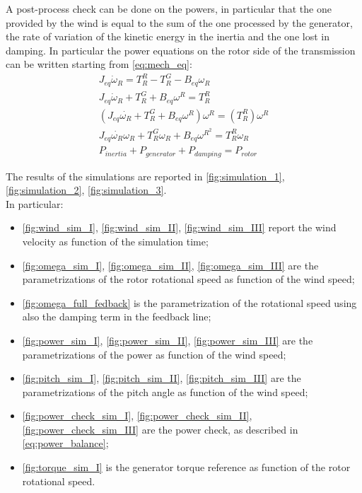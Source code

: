 A post-process check can be done on the powers, in particular that the one provided by the wind is equal to the sum of the one processed by the generator, the rate of variation of the kinetic energy in the inertia and the one lost in damping. In particular the power equations on the rotor side of the transmission can be written starting from \autoref{eq:mech_eq}:
\begin{gather}
    J_{eq}\dot{\omega}_{R} = T_R^R - T_R^G-B_{eq}\omega_R\\
    J_{eq}\dot{\omega}_{R} + T_R^G + B_{eq}\omega^R = T_R^R\\
    \left(J_{eq}\dot{\omega_{R}} + T_R^G + B_{eq}\omega^R\right)\omega^R = \left(T_R^R\right)\omega^R\\
    J_{eq}\dot{\omega_{R}}\omega_{R} + T_R^{G}\omega_{R} + B_{eq}\omega^{R^{2}} = T_R^{R}\omega_{R}\\
    P_{inertia} + P_{generator} + P_{damping} = P_{rotor} 
    \label{eq:power_balance}
\end{gather}

The results of the simulations are reported in \autoref{fig:simulation_1}, \ref{fig:simulation_2}, \ref{fig:simulation_3}. \\
In particular:
\begin{itemize}
  \item \autoref{fig:wind_sim_I}, \ref{fig:wind_sim_II}, \ref{fig:wind_sim_III} report the wind velocity as function of the simulation time;
  \item \autoref{fig:omega_sim_I}, \ref{fig:omega_sim_II}, \ref{fig:omega_sim_III} are the parametrizations of the rotor rotational speed as function of the wind speed;
  \item \autoref{fig:omega_full_fedback} is the parametrization of the rotational speed using also the damping term in the feedback line; 
  \item \autoref{fig:power_sim_I}, \ref{fig:power_sim_II}, \ref{fig:power_sim_III} are the parametrizations of the power as function of the wind speed;
  \item \autoref{fig:pitch_sim_I}, \ref{fig:pitch_sim_II}, \ref{fig:pitch_sim_III} are the parametrizations of the pitch angle as function of the wind speed;
  \item \autoref{fig:power_check_sim_I}, \ref{fig:power_check_sim_II}, \ref{fig:power_check_sim_III} are the power check, as described in \autoref{eq:power_balance};
  \item \autoref{fig:torque_sim_I} is the generator torque reference as function of the rotor rotational speed.
\end{itemize}

